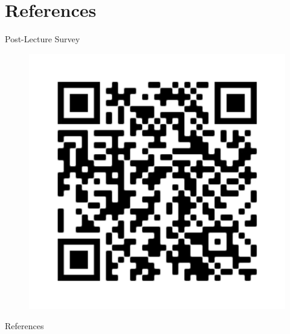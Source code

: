 \documentclass{beamer}
\begin{document}
\section{References}
	\begin{frame}{Post-Lecture Survey}
		\begin{figure}
			\centering
			\includegraphics[height=0.8\textheight]{figures/qr}
			\label{fig:qr}
		\end{figure}
	\end{frame}
	\begin{frame}[allowframebreaks]{References} %
		\printbibliography
	\end{frame}
\end{document}
